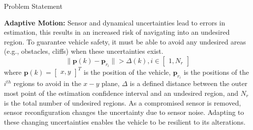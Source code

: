 \begin{section}{Problem Statement}
\begin{problem} \label{problem2} {\textbf{Adaptive Motion:}} 
Sensor and dynamical uncertainties lead to errors in estimation, this results in an increased risk of navigating into an undesired region. To guarantee vehicle safety, it must be able to avoid any undesired areas (e.g., obstacles, cliffs) when these uncertainties exist.
	\begin{equation}
		\lVert {\bm{p}(k)-\bm{p}_{r_i}} \rVert >\Delta(k),  i \in \begin{bmatrix} 1,N_r \end{bmatrix}
	\end{equation}
where $\bm{p}(k)={\begin{bmatrix} x,y \end{bmatrix}}^T$ is the position of the vehicle, $\bm{p}_{r_i}$ is the positions of the ${i}^{th}$ regions to avoid in the $x-y$ plane, $\Delta$ is a defined distance between the outer most point of the estimation confidence interval and an undesired region, and $N_r$ is the total number of undesired regions. As a compromised sensor is removed, sensor reconfiguration changes the uncertainty due to sensor noise. Adapting to these changing uncertainties enables the vehicle to be resilient to its alterations.


	
\end{problem}

\end{section}